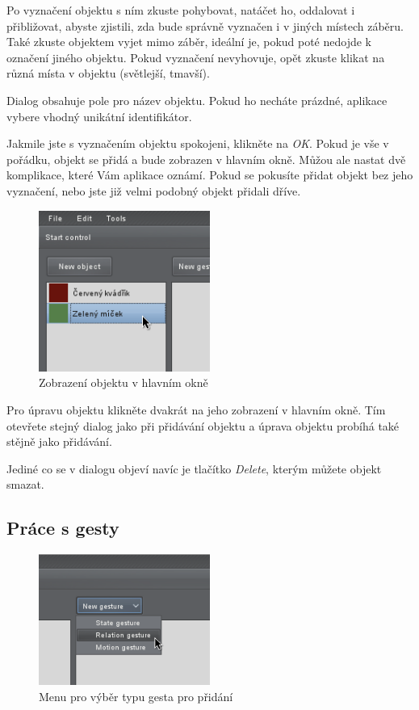 Po vyznačení objektu s ním zkuste pohybovat, natáčet ho, oddalovat i
přibližovat, abyste zjistili, zda bude správně vyznačen i v jiných místech
záběru. Také zkuste objektem vyjet mimo záběr, ideální je, pokud poté nedojde k
označení jiného objektu. Pokud vyznačení nevyhovuje, opět zkuste klikat na
různá místa v objektu (světlejší, tmavší).

Dialog obsahuje pole pro název objektu. Pokud ho necháte prázdné, aplikace
vybere vhodný unikátní identifikátor.

Jakmile jste s vyznačením objektu spokojeni, klikněte na \emph{OK}. Pokud je
vše v pořádku, objekt se přidá a bude zobrazen v hlavním okně. Můžou ale
nastat dvě komplikace, které Vám aplikace oznámí. Pokud se pokusíte přidat
objekt bez jeho vyznačení, nebo jste již velmi podobný objekt přidali dříve.

\begin{figure}[h]
\centering
\includegraphics[width=0.5\textwidth]{object.png}
\caption{Zobrazení objektu v hlavním okně}
\end{figure}

Pro úpravu objektu klikněte dvakrát na jeho zobrazení v hlavním okně. Tím
otevřete stejný dialog jako při přidávání objektu a úprava objektu probíhá
také stějně jako přidávání.

Jediné co se v dialogu objeví navíc je tlačítko
\emph{Delete}, kterým můžete objekt smazat. 

\subsection{Práce s gesty}

\begin{figure}[h]
\centering
\includegraphics[width=0.5\textwidth]{newgesturemenu.png}
\caption{Menu pro výběr typu gesta pro přidání}
\label{fig:newgesturemenu}
\end{figure}

